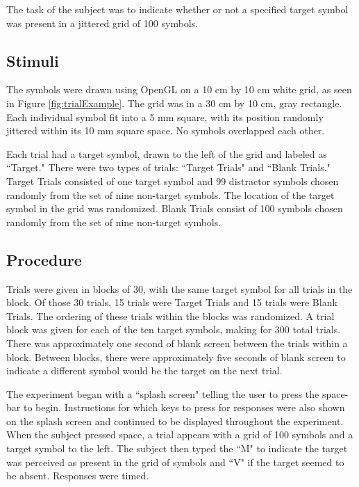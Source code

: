 \documentclass{article} %
\begin{document}
The task of the subject was to indicate whether or not a specified target symbol was present in a jittered grid of 100 symbols.


\subsection{Stimuli}

The symbols were drawn using OpenGL on a 10 cm by 10 cm white grid, as seen in Figure \ref{fig:trialExample}.  The grid was in a 30 cm by 10 cm, gray rectangle.  Each individual symbol fit into a 5 mm square, with its position randomly jittered within its 10 mm square space.  No symbols overlapped each other.

Each trial had a target symbol, drawn to the left of the grid and labeled as ``Target."  There were two types of trials: ``Target Trials" and ``Blank Trials."  Target Trials consisted of one target symbol and 99 distractor symbols chosen randomly from the set of nine non-target symbols.  The location of the target symbol in the grid was randomized.  Blank Trials consist of 100 symbols chosen randomly from the set of nine non-target symbols.

\subsection{Procedure}

Trials were given in blocks of 30, with the same target symbol for all trials in the block.  Of those 30 trials, 15 trials were Target Trials and 15 trials were Blank Trials.  The ordering of these trials within the blocks was randomized.  A trial block was given for each of the ten target symbols, making for 300 total trials.  There was approximately one second of blank screen between the trials within a block.  Between blocks, there were approximately five seconds of blank screen to indicate a different symbol would be the target on the next trial.

The experiment began with a ``splash screen" telling the user to press the space-bar to begin.  Instructions for which keys to press for responses were also shown on the splash screen and continued to be displayed throughout the experiment.  When the subject pressed space, a trial appears with a grid of 100 symbols and a target symbol to the left.  The subject then typed the ``M" to indicate the target was perceived as present in the grid of symbols and ``V" if the target seemed to be absent.  Responses were timed.
\end{document}

